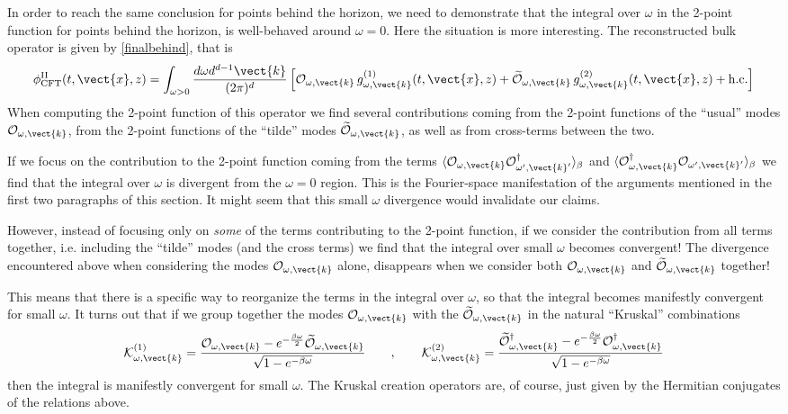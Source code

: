 In order to reach the same conclusion for points behind the horizon, we need to demonstrate that the integral over $\omega$ in the 2-point function for points behind the horizon, is well-behaved around $\omega=0$. Here the situation is more interesting. The reconstructed bulk operator is given by \eqref{finalbehind}, that is
\[
 \phi^{\rm II}_{\text{CFT}}(t,\vect{x},z) =
\int_{\omega>0} {d\omega d^{d-1}\vect{k} \over (2 \pi)^d} \left[ {\cal O}_{\omega,\vect{k}}\, g_{\omega,\vect{k}}^{(1)}(t,\vect{x},z) + \widetilde{\cal O}_{\omega,\vect{k}} \,g_{\omega,\vect{k}}^{(2)}(t,\vect{x},z)+ {\rm h.c.}
\right]
\]
When computing the 2-point function of this operator we find several contributions coming from the 2-point functions of the  ``usual'' modes ${\cal O}_{\omega,\vect{k}}$, from the 2-point functions of the  ``tilde'' modes $\widetilde{\cal O}_{\omega,\vect{k}}$, as well as from cross-terms between the two.

If we focus on the contribution to the 2-point function coming from the terms $\langle {\cal O}_{\omega,\vect{k}}
{\cal O}^\dagger_{\omega',\vect{k}'}\rangle_\beta$ and $\langle {\cal O}_{\omega,\vect{k}}^\dagger {\cal O}_{\omega',\vect{k}'}\rangle_\beta$ we find that the integral over $\omega$ is divergent from the $\omega=0$ region. This is the Fourier-space manifestation of the arguments mentioned in the first two paragraphs of this section. It might seem that this small $\omega$ divergence would invalidate our claims.

However, instead of focusing only on {\it some} of the terms contributing to the 2-point function, if we consider the contribution from all terms together, i.e. including the ``tilde'' modes (and the cross terms) we find that the integral over small $\omega$ becomes convergent! The divergence encountered above when considering the modes ${\cal O}_{\omega,\vect{k}}$ alone, disappears when we consider both ${\cal O}_{\omega,\vect{k}}$ and $\widetilde{\cal O}_{\omega,\vect{k}}$ together!

This means that there is a specific way to reorganize the terms in the integral over $\omega$, so that the integral becomes manifestly convergent for small $\omega$. It turns out that if we group together the modes ${\cal O}_{\omega,\vect{k}}$ with the $\widetilde{\cal O}_{\omega,\vect{k}}$ in the natural ``Kruskal'' combinations
\[
 {\cal K}^{(1)}_{\omega, \vect{k}} = {{\cal O}_{\omega,\vect{k}} - e^{-{\beta \omega\over 2}} \widetilde{\cal O}_{\omega,\vect{k}} \over \sqrt{1-e^{-\beta \omega}}}\qquad,\qquad
{\cal K}^{(2)}_{\omega, \vect{k}} =  {\widetilde{\cal O}_{\omega,\vect{k}}^\dagger - e^{-{\beta \omega\over 2}}{\cal O}^{\dagger}_{\omega,\vect{k}} \over \sqrt{1-e^{-\beta \omega}}}
\]
then the integral is manifestly convergent for small $\omega$. The Kruskal creation operators are, of course, just given by the Hermitian conjugates
of the relations above.

